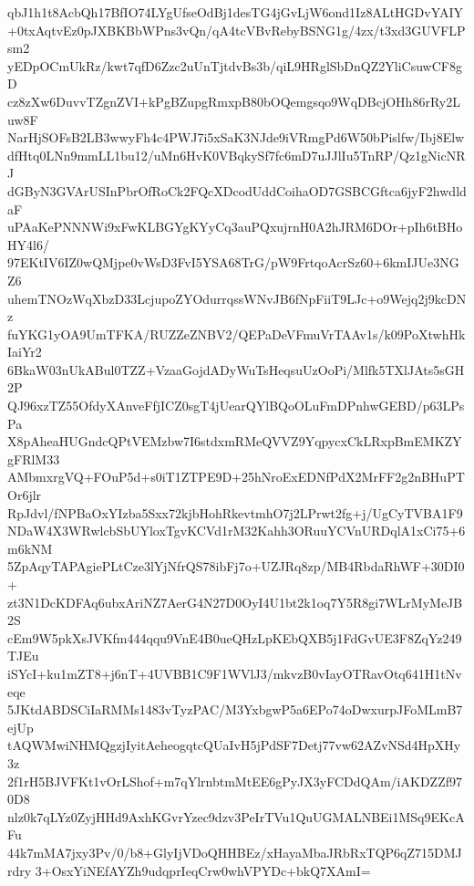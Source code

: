 qbJ1h1t8AcbQh17BfIO74LYgUfseOdBj1desTG4jGvLjW6ond1Iz8ALtHGDvYAIY
+0txAqtvEz0pJXBKBbWPns3vQn/qA4tcVBvRebyBSNG1g/4zx/t3xd3GUVFLPsm2
yEDpOCmUkRz/kwt7qfD6Zzc2uUnTjtdvBs3b/qiL9HRglSbDnQZ2YliCsuwCF8gD
cz8zXw6DuvvTZgnZVI+kPgBZupgRmxpB80bOQemgsqo9WqDBcjOHh86rRy2Luw8F
NarHjSOFsB2LB3wwyFh4c4PWJ7i5xSaK3NJde9iVRmgPd6W50bPislfw/Ibj8Elw
dfHtq0LNn9mmLL1bu12/uMn6HvK0VBqkySf7fc6mD7uJJlIu5TnRP/Qz1gNicNRJ
dGByN3GVArUSInPbrOfRoCk2FQcXDcodUddCoihaOD7GSBCGftca6jyF2hwdldaF
uPAaKePNNNWi9xFwKLBGYgKYyCq3auPQxujrnH0A2hJRM6DOr+pIh6tBHoHY4l6/
97EKtIV6IZ0wQMjpe0vWsD3FvI5YSA68TrG/pW9FrtqoAcrSz60+6kmIJUe3NGZ6
uhemTNOzWqXbzD33LcjupoZYOdurrqssWNvJB6fNpFiiT9LJc+o9Wejq2j9kcDNz
fuYKG1yOA9UmTFKA/RUZZeZNBV2/QEPaDeVFmuVrTAAv1s/k09PoXtwhHkIaiYr2
6BkaW03nUkABul0TZZ+VzaaGojdADyWuTsHeqsuUzOoPi/Mlfk5TXlJAts5sGH2P
QJ96xzTZ55OfdyXAnveFfjICZ0sgT4jUearQYlBQoOLuFmDPnhwGEBD/p63LPsPa
X8pAheaHUGndcQPtVEMzbw7I6stdxmRMeQVVZ9YqpycxCkLRxpBmEMKZYgFRlM33
AMbmxrgVQ+FOuP5d+s0iT1ZTPE9D+25hNroExEDNfPdX2MrFF2g2nBHuPTOr6jlr
RpJdvl/fNPBaOxYIzba5Sxx72kjbHohRkevtmhO7j2LPrwt2fg+j/UgCyTVBA1F9
NDaW4X3WRwlcbSbUYloxTgvKCVd1rM32Kahh3ORuuYCVnURDqlA1xCi75+6m6kNM
5ZpAqyTAPAgiePLtCze3lYjNfrQS78ibFj7o+UZJRq8zp/MB4RbdaRhWF+30DI0+
zt3N1DcKDFAq6ubxAriNZ7AerG4N27D0OyI4U1bt2k1oq7Y5R8gi7WLrMyMeJB2S
cEm9W5pkXsJVKfm444qqu9VnE4B0ueQHzLpKEbQXB5j1FdGvUE3F8ZqYz249TJEu
iSYcI+ku1mZT8+j6nT+4UVBB1C9F1WVlJ3/mkvzB0vIayOTRavOtq641H1tNveqe
5JKtdABDSCiIaRMMs1483vTyzPAC/M3YxbgwP5a6EPo74oDwxurpJFoMLmB7ejUp
tAQWMwiNHMQgzjIyitAeheogqtcQUaIvH5jPdSF7Detj77vw62AZvNSd4HpXHy3z
2f1rH5BJVFKt1vOrLShof+m7qYlrnbtmMtEE6gPyJX3yFCDdQAm/iAKDZZf970D8
nlz0k7qLYz0ZyjHHd9AxhKGvrYzec9dzv3PeIrTVu1QuUGMALNBEi1MSq9EKcAFu
44k7mMA7jxy3Pv/0/b8+GlyIjVDoQHHBEz/xHayaMbaJRbRxTQP6qZ715DMJrdry
3+OsxYiNEfAYZh9udqprIeqCrw0whVPYDc+bkQ7XAmI=
